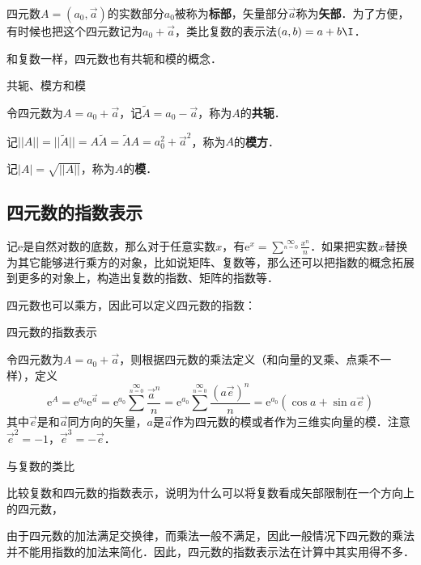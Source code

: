 四元数$A=(a_0, \vec{a})$的实数部分$a_0$被称为\textbf{标部}，矢量部分$\vec{a}$称为\textbf{矢部}．为了方便，有时候也把这个四元数记为$a_0+\vec{a}$，类比复数的表示法$(a, b)=a+b\I$．

和复数一样，四元数也有共轭和模的概念．

\begin{definition}{共轭、模方和模}

令四元数为$A=a_0+\vec{a}$，记$\widetilde{A}=a_0-\vec{a}$，称为$A$的\textbf{共轭}．

记$||A||=||\widetilde{A}||=A\widetilde{A}=\widetilde{A}A=a_0^2+\vec{a}^2$，称为$A$的\textbf{模方}．

记$|A|=\sqrt{||A||}$，称为$A$的\textbf{模}．

\end{definition}

\subsection{四元数的指数表示}

记$\mathrm{e}$是自然对数的底数，那么对于任意实数$x$，有$\mathrm{e}^x=\sum^\infty\limits_{n=0}\frac{x^n}{n}$．如果把实数$x$替换为其它能够进行乘方的对象，比如说矩阵、复数等，那么还可以把指数的概念拓展到更多的对象上，构造出复数的指数、矩阵的指数等．

四元数也可以乘方，因此可以定义四元数的指数：

\begin{definition}{四元数的指数表示}

令四元数为$A=a_0+\vec{a}$，则根据四元数的乘法定义（和向量的叉乘、点乘不一样），定义$$\mathrm{e}^A=\mathrm{e}^{a_0}\mathrm{e}^{\vec{a}}=\mathrm{e}^{a_0}\sum^\infty\limits_{n=0}\frac{\vec{a}^n}{n}=\mathrm{e}^{a_0}\sum^\infty\limits_{n=0}\frac{(a\vec{e})^n}{n}=\mathrm{e}^{a_0}(\cos{a}+\sin{a}\vec{e})$$其中$\vec{e}$是和$\vec{a}$同方向的矢量，$a$是$\vec{a}$作为四元数的模或者作为三维实向量的模．注意$\vec{e}^2=-1，\vec{e}^3=-\vec{e}$．

\end{definition}

\begin{exercise}{与复数的类比}

比较复数和四元数的指数表示，说明为什么可以将复数看成矢部限制在一个方向上的四元数，

\end{exercise}

由于四元数的加法满足交换律，而乘法一般不满足，因此一般情况下四元数的乘法并不能用指数的加法来简化．因此，四元数的指数表示法在计算中其实用得不多．

